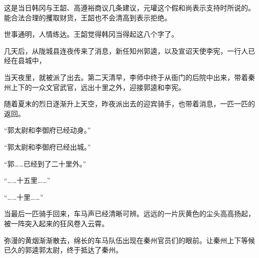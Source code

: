 这是当日韩冈与王韶、高遵裕商议几条建议，元瓘这个假和尚表示支持时所说的。能合法合理的攫取财货，王韶也不会清高到表示拒绝。

世事通明，人情练达。王韶觉得韩冈当得起这八个字了。

几天后，从陇城县连夜传来了消息，新任知州郭逵，以及宣诏天使李宪，一行人已经在县城中，

当天夜里，就被派了出去。第二天清早，李师中终于从衙门的后院中出来，带着秦州上下的一众文官武官，远出十里之外，迎接郭逵和李宪。

随着夏末的烈日逐渐升上天空，昨夜派出去的迎宾骑手，也带着消息，一匹一匹的返回。

“郭太尉和李御府已经动身。”

“郭太尉和李御府已经出城。”

“郭……已经到了二十里外。”

“……十五里……”

“……十里……”

当最后一匹骑手回来，车马声已经清晰可辨。远远的一片灰黄色的尘头高高扬起，被一阵突入起来的狂风卷入云霄。

弥漫的黄烟渐渐散去，绵长的车马队伍出现在秦州官员们的眼前。让秦州上下等候已久的郭逵郭太尉，终于抵达了秦州。

